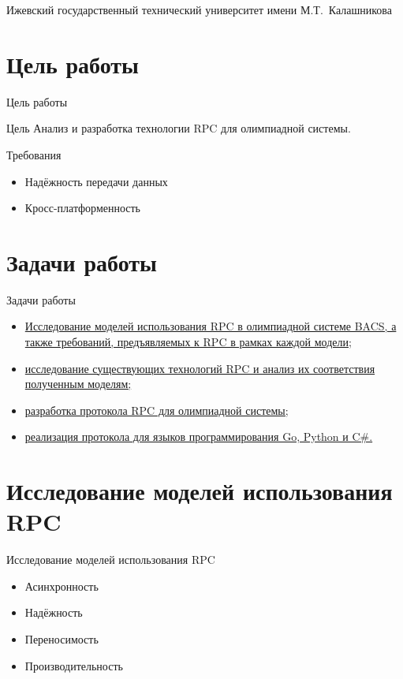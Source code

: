 \documentclass[xetex,mathserif,serif,10pt]{beamer}
\newenvironment{sframe}[2]{\section{#1}\begin{frame}[label=#2]{#1}}{\end{frame}}
\begin{document}
    \title[RPC]{\titletext}
    \author[Филиппов]{А.~Филиппов}
    \institute
    {
        Ижевский государственный технический университет имени М.Т.~Калашникова
    }

    

    \begin{sframe}{Цель работы}{target}
        \begin{block}{Цель}
            Анализ и разработка технологии RPC для олимпиадной системы.
        \end{block}

        \begin{block}{Требования}
            \begin{itemize}
                \item Надёжность передачи данных
                \item Кросс-платформенность
            \end{itemize}
        \end{block}
    \end{sframe}

    \begin{sframe}{Задачи работы}{problems}
        \begin{itemize}
            \item \hyperlink{analysis}{Исследование моделей использования RPC
                в олимпиадной системе BACS, а также требований,
                предъявляемых к RPC в рамках каждой модели};
            \item \hyperlink{review}{исследование существующих технологий RPC
                и анализ их соответствия полученным моделям;}
            \item \hyperlink{protodev}{разработка протокола RPC
                для олимпиадной системы;}
            \item \hyperlink{binddev}{реализация протокола для языков
                программирования Go, Python и C\#.}
        \end{itemize}
    \end{sframe}

    \begin{sframe}{Исследование моделей использования RPC}{analysis}
        \begin{itemize}
            \item Асинхронность
            \item Надёжность
            \item Переносимость
            \item Производительность
        \end{itemize}
        \begin{figure}
            \centering
            \resizebox*{!}{0.6\textheight}{}
        \end{figure}
    \end{sframe}
\end{document}
